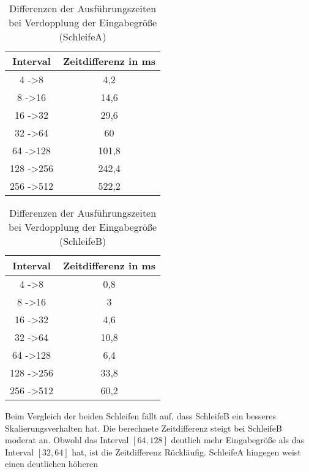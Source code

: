     \begin{table}[h]
        \centering
        \begin{tabular}{|c|c|}
            \hline
            \textbf{Interval}     & \textbf{Zeitdifferenz in ms} \\ \hline
            4 -\textgreater 8     & 4,2                          \\ \hline
            8 -\textgreater 16    & 14,6                         \\ \hline
            16 -\textgreater 32   & 29,6                         \\ \hline
            32 -\textgreater 64   & 60                           \\ \hline
            64 -\textgreater 128  & 101,8                        \\ \hline
            128 -\textgreater 256 & 242,4                        \\ \hline
            256 -\textgreater 512 & 522,2                        \\ \hline
        \end{tabular}
        \caption{Differenzen der Ausführungszeiten bei Verdopplung der Eingabegröße (SchleifeA)}
        \label{tab:zeitdifferenz-schleifea}    
    \end{table}
    \begin{table}[h]
        \centering
        \begin{tabular}{|c|c|}
            \hline
            \textbf{Interval}     & \textbf{Zeitdifferenz in ms} \\ \hline
            4 -\textgreater 8     & 0,8                          \\ \hline
            8 -\textgreater 16    & 3                            \\ \hline
            16 -\textgreater 32   & 4,6                          \\ \hline
            32 -\textgreater 64   & 10,8                         \\ \hline
            64 -\textgreater 128  & 6,4                          \\ \hline
            128 -\textgreater 256 & 33,8                         \\ \hline
            256 -\textgreater 512 & 60,2                         \\ \hline
        \end{tabular}
        \caption{Differenzen der Ausführungszeiten bei Verdopplung der Eingabegröße (SchleifeB)}
        \label{tab:zeitdifferenz-schleifeb}    
    \end{table}
    Beim Vergleich der beiden Schleifen fällt auf, dass SchleifeB ein besseres Skalierungsverhalten hat.
    Die berechnete Zeitdifferenz steigt bei SchleifeB moderat an.
    Obwohl das Interval $[64, 128]$ deutlich mehr Eingabegröße als das Interval $[32, 64]$ hat, ist die Zeitdifferenz Rückläufig.
    SchleifeA hingegen weist einen deutlichen höheren
    

